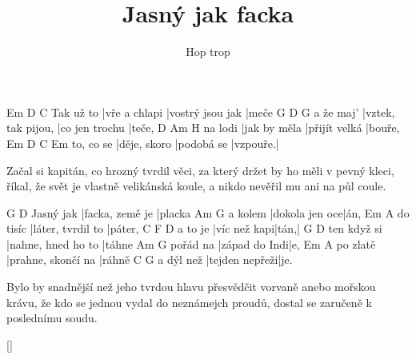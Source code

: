 \documentclass{song}
\title{Jasný jak facka}
\author{Hop trop}
\begin{document}
\strophe
          Em            D                C
Tak už to |vře a chlapi |vostrý jsou jak |meče
          G                  D              G
a že maj' |vztek, tak pijou, |co jen trochu |teče,
        D            Am            H\7
na lodi |jak by měla |přijít velká |bouře,
          Em           D          C        Em
to, co se |děje, skoro |podobá se |vzpouře.|
\endstrophe

\strophe*
Začal si kapitán, co hrozný tvrdil věci,
za který držet by ho měli v pevný kleci,
říkal, že svět je vlastně velikánská koule,
a nikdo nevěřil mu ani na půl coule.
\endstrophe

          G               D
Jasný jak |facka, země je |placka
        Am             G
a kolem |dokola jen oce|án,
         Em                A
do tisíc |láter, tvrdil to |páter,
        C            F    D
a to je |víc než kapi|tán,|
            G                  D
ten když si |nahne, hned ho to |táhne
         Am            G
pořád na |západ do Indi|e,
         Em                 A
po zlatě |prahne, skončí na |ráhně
          C              G
a dýl než |tejden nepřeži|je.
\endstrophe

\strophe*
Bylo by snadnější než jeho tvrdou hlavu
přesvědčit vorvaně anebo mořskou krávu,
že kdo se jednou vydal do neznámejch proudů,
dostal se zaručeně k poslednímu soudu.
\endstrophe

\ref{}
\end{document}
